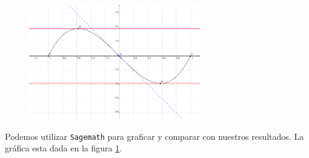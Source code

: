     \begin{figure}
        \centering
        \includegraphics[height=5cm,bb=0 0 681 456,keepaspectratio=true]{./calculo/ejemplo_graficacion.png}
        \label{fig:demo:grafica}
    \end{figure}



    Podemos utilizar \texttt{Sagemath} para graficar y comparar con nuestros resultados. La gráfica esta dada en la figura
    \ref{fig:demo:grafica}.


